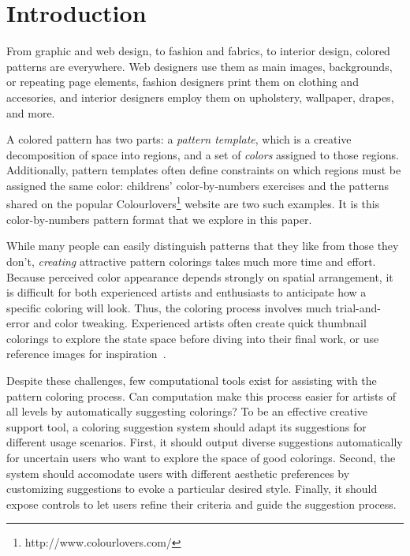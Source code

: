 \section{Introduction}
\label{sec:introduction}

From graphic and web design, to fashion and fabrics, to interior design, colored patterns are everywhere. Web designers use them as main images, backgrounds, or repeating page elements, fashion designers print them on clothing and accesories, and interior designers employ them on upholstery, wallpaper, drapes, and more.

A colored pattern has two parts: a \emph{pattern template}, which is a creative decomposition of space into regions, and a set of \emph{colors} assigned to those regions.
Additionally, pattern templates often define constraints on which regions must be assigned the same color: childrens' color-by-numbers exercises and the patterns shared on the popular Colourlovers\footnote{http://www.colourlovers.com/} website are two such examples. It is this color-by-numbers pattern format that we explore in this paper.

While many people can easily distinguish patterns that they like from those they don't, \emph{creating} attractive pattern colorings takes much more time and effort. Because perceived color appearance depends strongly on spatial arrangement, it is difficult for both experienced artists and enthusiasts to anticipate how a specific coloring will look. Thus, the coloring process involves much trial-and-error and color tweaking. Experienced artists often create quick thumbnail colorings to explore the state space before diving into their final work, or use reference images for inspiration~\cite{ColorPaletteTools}.

Despite these challenges, few computational tools exist for assisting with the pattern coloring process. Can computation make this process easier for artists of all levels by automatically suggesting colorings? To be an effective creative support tool, a coloring suggestion system should adapt its suggestions for different usage scenarios. First, it should output diverse suggestions automatically for uncertain users who want to explore the space of good colorings. Second, the system should accomodate users with different aesthetic preferences by customizing suggestions to evoke a particular desired style. Finally, it should expose controls to let users refine their criteria and guide the suggestion process. 

